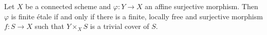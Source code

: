 
\begin{theorem}
	\label{theorem:locallyTrivial}
	Let $X$ be a connected scheme and $\varphi : Y \to X$ an affine surjective morphism. Then $\varphi$ is finite \'etale if and only if there is a finite, locally free and surjective morphism $f: S \to X$ such that $Y \times_X S$ is a trivial cover of $S$.
\end{theorem}

